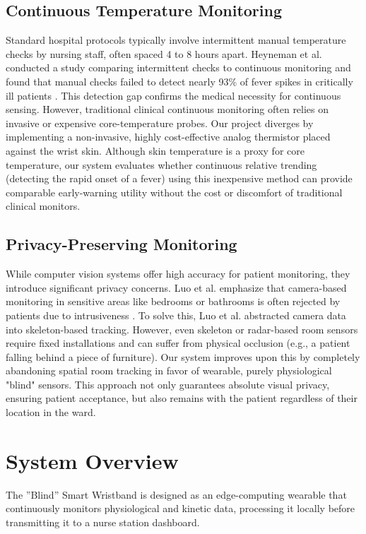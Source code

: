 \documentclass[conference]{IEEEtran}
\begin{document}
\subsection{Continuous Temperature Monitoring}
Standard hospital protocols typically involve intermittent manual temperature checks by nursing staff, often spaced 4 to 8 hours apart. Heyneman et al. conducted a study comparing intermittent checks to continuous monitoring and found that manual checks failed to detect nearly 93\% of fever spikes in critically ill patients \cite{heyneman2015}. This detection gap confirms the medical necessity for continuous sensing. However, traditional clinical continuous monitoring often relies on invasive or expensive core-temperature probes. Our project diverges by implementing a non-invasive, highly cost-effective analog thermistor placed against the wrist skin. Although skin temperature is a proxy for core temperature, our system evaluates whether continuous relative trending (detecting the rapid onset of a fever) using this inexpensive method can provide comparable early-warning utility without the cost or discomfort of traditional clinical monitors.

\subsection{Privacy-Preserving Monitoring}
While computer vision systems offer high accuracy for patient monitoring, they introduce significant privacy concerns. Luo et al. emphasize that camera-based monitoring in sensitive areas like bedrooms or bathrooms is often rejected by patients due to intrusiveness \cite{luo2024}. To solve this, Luo et al. abstracted camera data into skeleton-based tracking. However, even skeleton or radar-based room sensors require fixed installations and can suffer from physical occlusion (e.g., a patient falling behind a piece of furniture). Our system improves upon this by completely abandoning spatial room tracking in favor of wearable, purely physiological "blind" sensors. This approach not only guarantees absolute visual privacy, ensuring patient acceptance, but also remains with the patient regardless of their location in the ward.

\section{System Overview}\label{system_overview}
The ''Blind'' Smart Wristband is designed as an edge-computing wearable that continuously monitors physiological and kinetic data, processing it locally before transmitting it to a nurse station dashboard.
\end{document}
